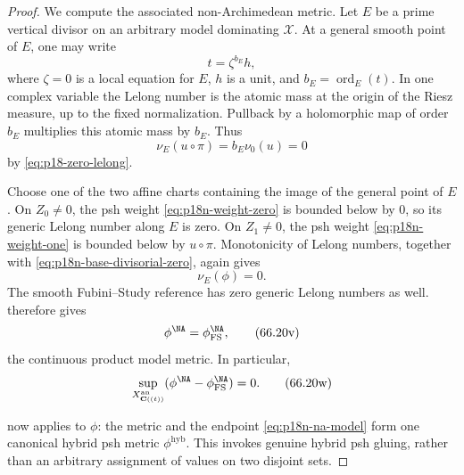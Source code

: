 \begin{proof}
We compute the associated non-Archimedean metric.  Let \(E\) be a prime
vertical divisor on an arbitrary model dominating \(\mathcal X\).  At a
general smooth point of \(E\), one may write
\[
                          t=\zeta^{b_E}h,
\]
where \(\zeta=0\) is a local equation for \(E\), \(h\) is a unit, and
\(b_E=\operatorname{ord}_E(t)\).  In one complex variable the Lelong
number is the atomic mass at the origin of the Riesz measure, up to the
fixed normalization.  Pullback by a holomorphic map of order \(b_E\)
multiplies this atomic mass by \(b_E\).  Thus
\[
                 \nu_E(u\circ\pi)
                 =b_E\nu_0(u)=0
\tag{66.20t}\label{eq:p18n-base-divisorial-zero}
\]
by \eqref{eq:p18-zero-lelong}.

Choose one of the two affine charts containing the image of the general
point of \(E\).  On \(Z_0\ne0\), the psh weight
\eqref{eq:p18n-weight-zero} is bounded below by \(0\), so its generic
Lelong number along \(E\) is zero.  On \(Z_1\ne0\), the psh weight
\eqref{eq:p18n-weight-one} is bounded below by \(u\circ\pi\).
Monotonicity of Lelong numbers, together with
\eqref{eq:p18n-base-divisorial-zero}, again gives
\[
                         \nu_E(\phi)=0.
\tag{66.20u}\label{eq:p18n-metric-divisorial-zero}
\]
The smooth Fubini--Study reference has zero generic Lelong numbers as
well.  \cite[Theorem~3.10]{PS23Hybrid} therefore gives
\[
                  \phi^{\NA}
                  =\phi_{\mathrm{FS}}^{\NA},
\tag{66.20v}\label{eq:p18n-na-model}
\]
the continuous product model metric.  In particular,
\[
 \sup_{X_{\mathbf C((t))}^{\mathrm{an}}}
 (\phi^{\NA}-\phi_{\mathrm{FS}}^{\NA})=0.
\tag{66.20w}\label{eq:p18n-na-normalization}
\]

\cite[Theorem~3.13]{PS23Hybrid} now applies to \(\phi\): the metric and
the endpoint \eqref{eq:p18n-na-model} form one canonical hybrid psh
metric \(\phi^{\mathrm{hyb}}\).  This invokes genuine hybrid psh
gluing, rather than an arbitrary assignment of values on two disjoint
sets.


\end{proof}
